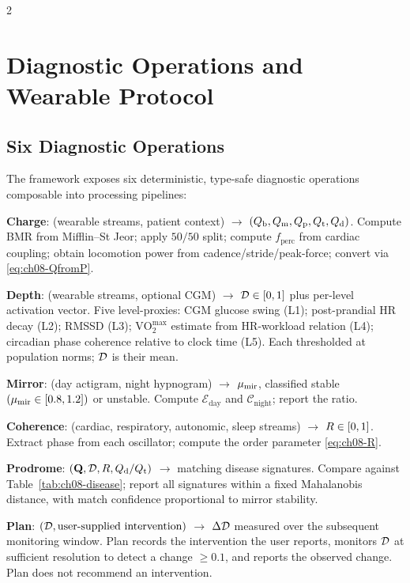 \begin{multicols}{2}

\section{Diagnostic Operations and Wearable Protocol}
\label{sec:ch08-diagnostic}

\subsection{Six Diagnostic Operations}

The framework exposes six deterministic, type-safe diagnostic operations composable into processing pipelines:

\textbf{Charge}: (wearable streams, patient context) $\to$ $(Q_{\mathrm{b}}, Q_{\mathrm{m}}, Q_{\mathrm{p}}, Q_{\mathrm{t}}, Q_{\mathrm{d}})$. Compute BMR from Mifflin--St Jeor; apply $50/50$ split; compute $f_{\mathrm{perc}}$ from cardiac coupling; obtain locomotion power from cadence/stride/peak-force; convert via \eqref{eq:ch08-QfromP}.

\textbf{Depth}: (wearable streams, optional CGM) $\to$ $\mathcal{D} \in [0,1]$ plus per-level activation vector. Five level-proxies: CGM glucose swing (L1); post-prandial HR decay (L2); RMSSD (L3); $\mathrm{VO}_2^{\max}$ estimate from HR-workload relation (L4); circadian phase coherence relative to clock time (L5). Each thresholded at population norms; $\mathcal{D}$ is their mean.

\textbf{Mirror}: (day actigram, night hypnogram) $\to$ $\mu_{\mathrm{mir}}$, classified stable $(\mu_{\mathrm{mir}} \in [0.8,1.2])$ or unstable. Compute $\mathcal{E}_{\mathrm{day}}$ and $\mathcal{C}_{\mathrm{night}}$; report the ratio.

\textbf{Coherence}: (cardiac, respiratory, autonomic, sleep streams) $\to$ $R \in [0,1]$. Extract phase from each oscillator; compute the order parameter \eqref{eq:ch08-R}.

\textbf{Prodrome}: $(\mathbf{Q}, \mathcal{D}, R, Q_{\mathrm{d}}/Q_{\mathrm{t}})$ $\to$ matching disease signatures. Compare against Table~\ref{tab:ch08-disease}; report all signatures within a fixed Mahalanobis distance, with match confidence proportional to mirror stability.

\textbf{Plan}: $(\mathcal{D}, \text{user-supplied intervention})$ $\to$ $\Delta\mathcal{D}$ measured over the subsequent monitoring window. Plan records the intervention the user reports, monitors $\mathcal{D}$ at sufficient resolution to detect a change $\geq 0.1$, and reports the observed change. Plan does not recommend an intervention.


\end{multicols}
